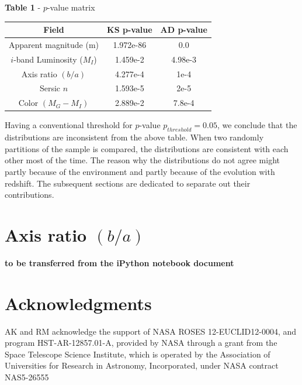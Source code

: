 \documentclass[twocolumn,useAMS,usenatbib]{mn2e}
\newcommand{\mi}{\ensuremath{M_I}}
\newcommand{\sersicn}{Sersic $n$}
\begin{document}
{\bf Table 1 } - $p$-value matrix 
\begin{tabular}{||c|c|c||}
 \hline
  Field & KS p-value & AD p-value \\
 \hline 
  Apparent magnitude (m) & 1.972e-86 & 0.0 \\
  $i$-band Luminosity (\mi) & 1.459e-2 & 4.98e-3 \\
  Axis ratio $(b/a)$ & 4.277e-4 & 1e-4\\
  \sersicn & 1.593e-5 & 2e-5\\
  Color $(M_G-M_I)$ & 2.889e-2 & 7.8e-4\\
  
\end{tabular}

Having a conventional threshold for $p$-value $p_{threshold} = 0.05$, we conclude that the distributions are inconsistent from the above table.
When two randomly partitions of the sample is compared, the distributions are consistent with each other most of the time. The reason why the distributions
do not agree might partly because of the environment and partly because of the evolution with redshift. The subsequent sections are dedicated to separate out
their contributions.



% 

\section{Axis ratio $(b/a)$}


{\bf to be transferred from the iPython notebook document}

\section*{Acknowledgments}

AK and RM acknowledge the support of NASA ROSES 12-EUCLID12-0004, and
program HST-AR-12857.01-A, provided by NASA through a grant from the
Space Telescope Science Institute, which is operated by the
Association of Universities for Research in Astronomy, Incorporated,
under NASA contract NAS5-26555
\end{document}
